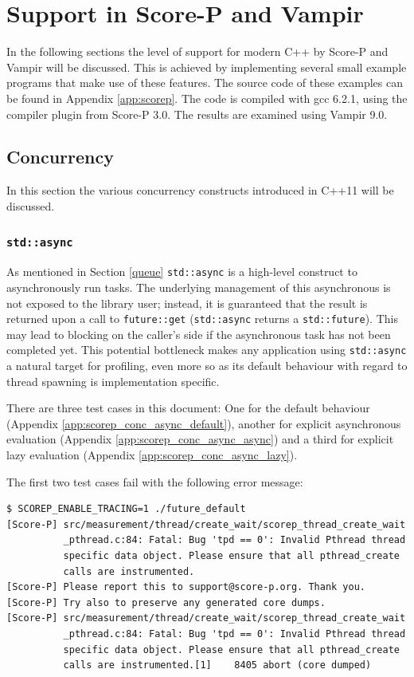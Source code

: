 \section{Support in Score-P and Vampir}

In the following sections the level of support for modern C++ by Score-P and Vampir will be discussed. This is achieved by implementing several small example programs that make use of these features. The source code of these examples can be found in Appendix \ref{app:scorep}. The code is compiled with gcc 6.2.1, using the compiler plugin from Score-P 3.0. The results are examined using Vampir 9.0.

\subsection{Concurrency}

In this section the various concurrency constructs introduced in C++11 will be discussed.

\subsubsection{\texttt{std::async}}\label{scorep:conc_async}

As mentioned in Section \ref{queue} \texttt{std::async} is a high-level construct to asynchronously run tasks. The underlying management of this asynchronous is not exposed to the library user; instead, it is guaranteed that the result is returned upon a call to \texttt{future::get} (\texttt{std::async} returns a \texttt{std::future}). This may lead to blocking on the caller's side if the asynchronous task has not been completed yet. This potential bottleneck makes any application using \texttt{std::async} a natural target for profiling, even more so as its default behaviour with regard to thread spawning is implementation specific.

There are three test cases in this document: One for the default behaviour (Appendix \ref{app:scorep_conc_async_default}), another for explicit asynchronous evaluation (Appendix \ref{app:scorep_conc_async_async}) and a third for explicit lazy evaluation (Appendix \ref{app:scorep_conc_async_lazy}).

The first two test cases fail with the following error message:

\begin{verbatim}
$ SCOREP_ENABLE_TRACING=1 ./future_default                                      
[Score-P] src/measurement/thread/create_wait/scorep_thread_create_wait
          _pthread.c:84: Fatal: Bug 'tpd == 0': Invalid Pthread thread
          specific data object. Please ensure that all pthread_create
          calls are instrumented.
[Score-P] Please report this to support@score-p.org. Thank you.
[Score-P] Try also to preserve any generated core dumps.
[Score-P] src/measurement/thread/create_wait/scorep_thread_create_wait
          _pthread.c:84: Fatal: Bug 'tpd == 0': Invalid Pthread thread
          specific data object. Please ensure that all pthread_create
          calls are instrumented.[1]    8405 abort (core dumped)
\end{verbatim}

